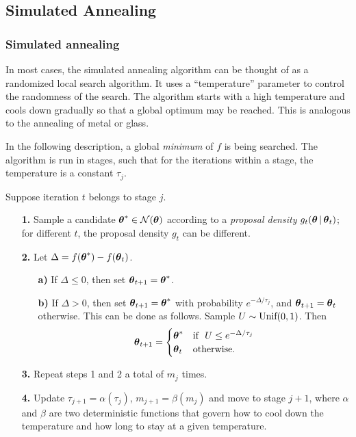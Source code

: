 \subsection{Simulated Annealing}

\begin{frame}
  \frametitle{Simulated annealing}
  In most cases, the simulated annealing algorithm can be thought of
  as a randomized local search algorithm.  It uses a ``temperature''
  parameter to control the randomness of the search.  The algorithm
  starts with a high temperature and cools down gradually so that a
  global optimum may be reached.  This is analogous to the annealing
  of metal or glass.
  
  In the following description, a global \emph{minimum} of
  $f$ is being searched.  The algorithm is run in stages, such that
  for the iterations within a stage, the temperature is a constant
  $\tau_j$.
\end{frame}


\begin{frame}
  Suppose iteration $t$ belongs to stage $j$.
  \begin{enumerate}
  \item[\bf 1.] Sample a candidate $\boldsymbol{\theta}^*\in \mathcal{N}(\boldsymbol{\theta})$
    according to a \emph{proposal density\/} $g_t(\boldsymbol{\theta}\,|\,
    \boldsymbol{\theta}_t)$; for different $t$, the proposal density $g_t$ can
    be different.
  \item[\bf 2.] Let $\Delta=f(\boldsymbol{\theta}^*)-f(\boldsymbol{\theta}_t)$.
    \begin{enumerate}
    \item[\bf a)] If $\Delta\le  0$, then set
      $\boldsymbol{\theta}_{t+1}=\boldsymbol{\theta}^*$.
    \item[\bf b)] If $\Delta>0$, then set
      $\boldsymbol{\theta}_{t+1}=\boldsymbol{\theta}^*$ with probability
      $e^{-\Delta/\tau_j}$, and $\boldsymbol{\theta}_{t+1}=\boldsymbol{\theta}_t$
      otherwise.  This can be done as follows.  Sample $U\sim
      \text{Unif}(0,1)$.  Then
      \begin{align*}
        \boldsymbol{\theta}_{t+1}
        =
        \begin{cases}
          \boldsymbol{\theta}^* & \text{if}\ \ U\le e^{-\Delta/\tau_j} \\
          \boldsymbol{\theta}_t & \text{otherwise}.
        \end{cases}
      \end{align*}
    \end{enumerate}
  \item[\bf 3.] Repeat steps 1 and 2 a total of $m_j$ times.
  \item[\bf 4.] Update $\tau_{j+1}=\alpha(\tau_j)$, $m_{j+1} =
    \beta(m_j)$ and move to stage $j+1$, where $\alpha$ and $\beta$
    are two deterministic functions that govern how to cool down the
    temperature  and how long to stay at a given temperature.
  \end{enumerate}
  
\end{frame}


